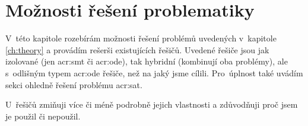 \documentclass[thesis=M,czech]{FITthesis}[2012/06/26]
\newcommand{\acrlabel}[1]{acr:#1}
\newcommand{\acr}[1]{\acrshort{\acrlabel{#1}}}
\newcommand{\rf}[1]{\ref{#1}}
\begin{document}


\chapter{Možnosti řešení problematiky}\label{ch:search}
V~této kapitole rozebírám možnosti řešení problémů
uvedených v~kapitole \rf{ch:theory}
a provádím rešerši existujících řešičů.
Uvedené řešiče jsou jak izolované (jen \acr{smt} či \acr{ode}),
tak hybridní (kombinují oba problémy),
ale s~odlišným typem \acr{ode} řešiče, než na jaký jsme cílili.
Pro~úplnost také uvádím sekci ohledně řešení problému \acr{sat}.

U~řešičů zmiňuji více či méně podrobně
jejich vlastnosti a zdůvodňuji proč jsem je použil či nepoužil.

\end{document}
